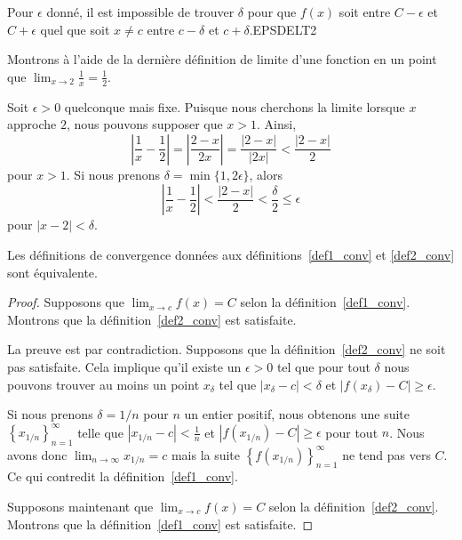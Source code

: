 {
{Pour $\epsilon$ donné, il est impossible de trouver $\delta$ pour que
$f(x)$ soit entre $C-\epsilon$ et $C+\epsilon$ quel que soit $x \neq c$
entre $c-\delta$ et $c+\delta$.}{EPSDELT2}

\begin{egg}
Montrons à l'aide de la dernière définition de limite d'une fonction
en un point que
$\displaystyle \lim_{x\rightarrow 2} \frac{1}{x} = \frac{1}{2}$.

Soit $\epsilon >0$ quelconque mais fixe.  Puisque nous cherchons la
limite lorsque $x$ approche $2$, nous pouvons supposer que $x>1$.
Ainsi,
\[ 
\left|\frac{1}{x} - \frac{1}{2}\right| = \left| \frac{2-x}{2x} \right|
= \frac{|2-x|}{|2x|} < \frac{|2-x|}{2}
\]
pour $x>1$.  Si nous prenons $\delta = \min\{1, 2\epsilon\}$, alors
\[
\left|\frac{1}{x} - \frac{1}{2}\right| < \frac{|2-x|}{2}
< \frac{\delta}{2} \leq \epsilon
\]
pour $|x-2|<\delta$.
\end{egg}

\begin{prop}
Les définitions de convergence données aux définitions~\ref{def1_conv}
et \ref{def2_conv} sont équivalente.
\end{prop}

\begin{proof}
 Supposons que $\displaystyle \lim_{x\rightarrow c} f(x) = C$
selon la définition~\ref{def1_conv}.  Montrons que la
définition~\ref{def2_conv} est satisfaite.

La preuve est par contradiction.  Supposons que la
définition~\ref{def2_conv} ne soit pas satisfaite.  Cela implique
qu'il existe un $\epsilon >0$ tel que pour tout $\delta$ nous pouvons
trouver au moins un point $x_\delta$ tel que
$\displaystyle \left|x_\delta -c\right| < \delta$ et
$\displaystyle \left|f(x_\delta) -C\right| \geq \epsilon$.

Si nous prenons $\delta = 1/n$ pour $n$ un entier positif, nous
obtenons une
suite $\displaystyle \left\{ x_{1/n} \right\}_{n=1}^\infty$ telle que
$\displaystyle \left|x_{1/n} - c \right| < \frac{1}{n}$ et
$\displaystyle \left|f(x_{1/n}) -C\right| \geq \epsilon$ pour tout $n$.
Nous avons donc $\displaystyle \lim_{n\rightarrow \infty} x_{1/n} = c$ mais
la suite $\displaystyle \left\{ f(x_{1/n}) \right\}_{n=1}^\infty$ ne
tend pas vers $C$.  Ce qui contredit la définition~\ref{def1_conv}.

 Supposons maintenant que
$\displaystyle \lim_{x\rightarrow c} f(x) = C$ selon la
définition~\ref{def2_conv}.  Montrons que la
définition~\ref{def1_conv} est satisfaite.


\end{proof}}
